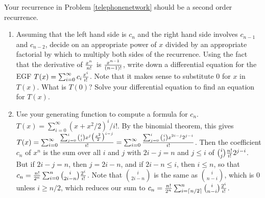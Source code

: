 \itemesi Your recurrence in Problem \ref{telephonenetwork} should be a
second order recurrence.  
\begin{enumerate}
\item Assuming that the left hand side is $c_n$ and
the right hand side involves $c_{n-1}$ and $c_{n-2}$, decide on an
appropriate power of $x$ divided by an appropriate factorial by which to
multiply both sides of the recurrence.  Using the fact that the
derivative of $x^n\over n!$ is $x^{n-1}\over (n-1)!$, write down a
differential equation for the EGF $T(x) =
\sum_{i=0}^\infty c_i{x^i\over i!}$.  Note that it makes sense to
substitute 0 for
$x$ in $T(x)$.  What is $T(0)$?  Solve your differential equation to find
an equation for
$T(x)$.\label{telephonenetworkEGF}
\item Use your generating function to compute a formula for $c_n$.
 \solution
{
$T(x) = \sum_{i=0}^\infty (x+x^2/2)^i/i!$.  By the binomial
theorem, this gives $T(x) = \sum_{i=0}^\infty {\sum_{j=0}^i {i\choose
j}x^j\bigl({x^2\over2}\bigr)^{i-j}\over
i!}=\sum_{i=0}^\infty{\sum_{j=0}^i{i\choose j}x^{2i-j}2^{j-i}\over i!}$. 
Then the coefficient $c_n$ of $x^n$ is the sum over all $i$ and $j$ with
$2i-j=n$ and $j\le i$ of ${i\choose j}{n!\over i!}2^{j-i}$.  But if
$2i-j=n$, then $j= 2i-n$, and if $2i-n\le i$, then $i\le n$, so that $c_n
= {n!\over 2^n}\sum_{i=0}^n{i\choose 2i-n}{2^i\over i!}$.  Note that
$i\choose 2i-n$ is the same as $i\choose n-i$, which is 0 unless $i\ge
n/2$, which reduces our sum to $c_n = {n!\over
2^n}\sum_{i=\lceil n/2\rceil}^n{i\choose n-i}{2^i\over i!}$.
}
\end{enumerate}

